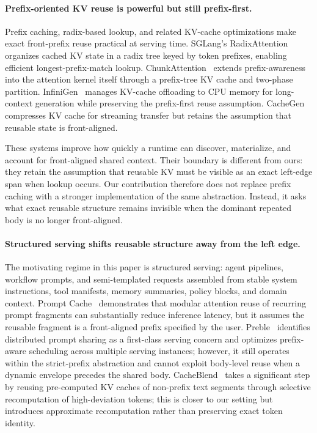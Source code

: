 \documentclass[conference]{IEEEtran}
\begin{document}
\paragraph{Prefix-oriented KV reuse is powerful but still prefix-first.}
Prefix caching, radix-based lookup, and related KV-cache optimizations make exact front-prefix reuse practical at serving time. SGLang's RadixAttention~\cite{zheng2024sglang} organizes cached KV state in a radix tree keyed by token prefixes, enabling efficient longest-prefix-match lookup. ChunkAttention~\cite{ye2024chunkattention} extends prefix-awareness into the attention kernel itself through a prefix-tree KV cache and two-phase partition. InfiniGen~\cite{lee2024infinigen} manages KV-cache offloading to CPU memory for long-context generation while preserving the prefix-first reuse assumption. CacheGen~\cite{ruan2024cachegen} compresses KV cache for streaming transfer but retains the assumption that reusable state is front-aligned.

These systems improve how quickly a runtime can discover, materialize, and account for front-aligned shared context. Their boundary is different from ours: they retain the assumption that reusable KV must be visible as an exact left-edge span when lookup occurs. Our contribution therefore does not replace prefix caching with a stronger implementation of the same abstraction. Instead, it asks what exact reusable structure remains invisible when the dominant repeated body is no longer front-aligned.

\paragraph{Structured serving shifts reusable structure away from the left edge.}
The motivating regime in this paper is structured serving: agent pipelines, workflow prompts, and semi-templated requests assembled from stable system instructions, tool manifests, memory summaries, policy blocks, and domain context. Prompt Cache~\cite{gim2024promptcache} demonstrates that modular attention reuse of recurring prompt fragments can substantially reduce inference latency, but it assumes the reusable fragment is a front-aligned prefix specified by the user. Preble~\cite{srivatsa2024preble} identifies distributed prompt sharing as a first-class serving concern and optimizes prefix-aware scheduling across multiple serving instances; however, it still operates within the strict-prefix abstraction and cannot exploit body-level reuse when a dynamic envelope precedes the shared body. CacheBlend~\cite{yao2025cacheblend} takes a significant step by reusing pre-computed KV caches of non-prefix text segments through selective recomputation of high-deviation tokens; this is closer to our setting but introduces approximate recomputation rather than preserving exact token identity.
\end{document}
